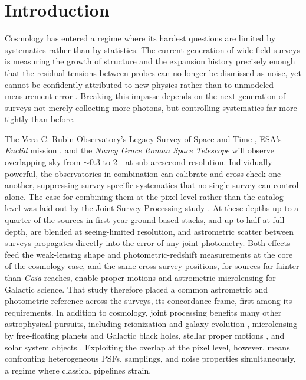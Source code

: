 \documentclass[twocolumn,linenumbers]{aastex701}
\begin{document}

\section{Introduction}

Cosmology has entered a regime where its hardest questions are limited by systematics rather than by statistics. The current generation of wide-field surveys is measuring the growth of structure and the expansion history precisely enough that the residual tensions between probes can no longer be dismissed as noise, yet cannot be confidently attributed to new physics rather than to unmodeled measurement error \citep{Rhodes2017}. Breaking this impasse depends on the next generation of surveys not merely collecting more photons, but controlling systematics far more tightly than before.

The Vera C. Rubin Observatory's Legacy Survey of Space and Time \citep[LSST;][]{Ivezic2019}, ESA's \textit{Euclid} mission \citep{Mellier2025}, and the \textit{Nancy Grace Roman Space Telescope} \citep{Spergel2015} will observe overlapping sky from ${\sim}0.3$ to 2~\micron\ at sub-arcsecond resolution. Individually powerful, the observatories in combination can calibrate and cross-check one another, suppressing survey-specific systematics that no single survey can control alone. The case for combining them at the pixel level rather than the catalog level was laid out by the Joint Survey Processing study \citep{Chary2020}. At these depths up to a quarter of the sources in first-year ground-based stacks, and up to half at full depth, are blended at seeing-limited resolution, and astrometric scatter between surveys propagates directly into the error of any joint photometry. Both effects feed the weak-lensing shape and photometric-redshift measurements at the core of the cosmology case, and the same cross-survey positions, for sources far fainter than \textit{Gaia} reaches, enable proper motions and astrometric microlensing for Galactic science. That study therefore placed a common astrometric and photometric reference across the surveys, its concordance frame, first among its requirements. In addition to cosmology, joint processing benefits many other astrophysical pursuits, including reionization and galaxy evolution \citep{Faisst2022}, microlensing by free-floating planets and Galactic black holes, stellar proper motions \citep{FajardoAcosta2022}, and solar system objects \citep{Chary2020}. Exploiting the overlap at the pixel level, however, means confronting heterogeneous PSFs, samplings, and noise properties simultaneously, a regime where classical pipelines strain.
\end{document}
